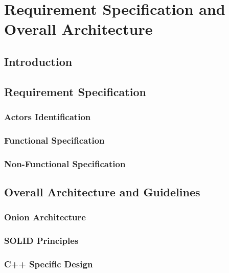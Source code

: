 
\setcounter{chapter}{1}
\chapter{Requirement Specification and Overall Architecture}
\minitoc %
\graphicspath{{Chapitre2/figures/}}


\pagestyle{fancy}
\fancyhf{}
\fancyhead[R]{\bfseries\rightmark}
\fancyfoot[R]{\thepage}
\renewcommand{\headrulewidth}{0.5pt}
\renewcommand{\footrulewidth}{0pt}
\renewcommand{\chaptermark}[1]{\markboth{\MakeUppercase{\chaptername~\thechapter. #1 }}{}}
\renewcommand{\sectionmark}[1]{\markright{\thechapter.\thesection~ #1}}

\begin{spacing}{1.2}
\section*{Introduction}
\section{Requirement Specification}
\subsection{Actors Identification}
\subsection{Functional Specification}
\subsection{Non-Functional Specification}
\section{Overall Architecture and Guidelines}
\subsection{Onion Architecture}
\subsection{SOLID Principles}
\subsection{C++ Specific Design}

\end{spacing}
